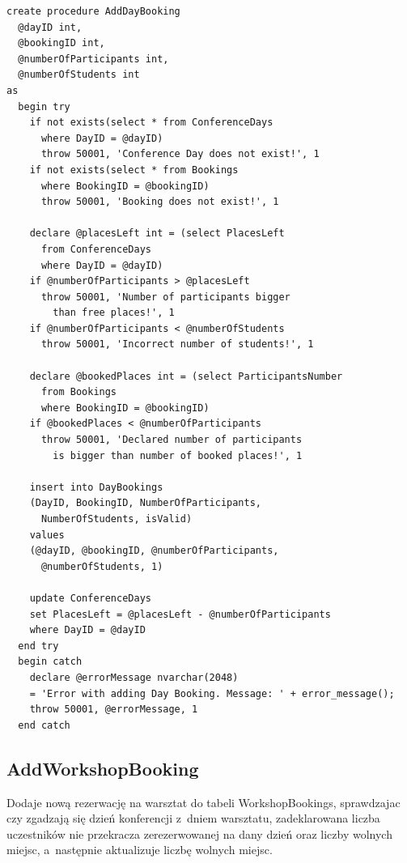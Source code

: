 \documentclass[12pt, a4paper]{mwrep}
\begin{document}
\begin{lstlisting}
create procedure AddDayBooking
  @dayID int,
  @bookingID int,
  @numberOfParticipants int,
  @numberOfStudents int
as
  begin try
    if not exists(select * from ConferenceDays 
      where DayID = @dayID)
      throw 50001, 'Conference Day does not exist!', 1
    if not exists(select * from Bookings 
      where BookingID = @bookingID)
      throw 50001, 'Booking does not exist!', 1

    declare @placesLeft int = (select PlacesLeft 
      from ConferenceDays 
      where DayID = @dayID)
    if @numberOfParticipants > @placesLeft
      throw 50001, 'Number of participants bigger 
        than free places!', 1
    if @numberOfParticipants < @numberOfStudents
      throw 50001, 'Incorrect number of students!', 1
      
    declare @bookedPlaces int = (select ParticipantsNumber 
      from Bookings 
      where BookingID = @bookingID)
    if @bookedPlaces < @numberOfParticipants
      throw 50001, 'Declared number of participants 
        is bigger than number of booked places!', 1

    insert into DayBookings
    (DayID, BookingID, NumberOfParticipants, 
      NumberOfStudents, isValid)
    values
    (@dayID, @bookingID, @numberOfParticipants, 
      @numberOfStudents, 1)

    update ConferenceDays
    set PlacesLeft = @placesLeft - @numberOfParticipants
    where DayID = @dayID
  end try
  begin catch
    declare @errorMessage nvarchar(2048)
    = 'Error with adding Day Booking. Message: ' + error_message();
    throw 50001, @errorMessage, 1
  end catch
\end{lstlisting}

\subsection{AddWorkshopBooking}

\noindent Dodaje nową rezerwację na warsztat do tabeli WorkshopBookings, sprawdzajac czy zgadzają się dzień konferencji z~dniem warsztatu, zadeklarowana liczba uczestników nie przekracza zerezerwowanej na dany dzień oraz liczby wolnych miejsc, a~następnie aktualizuje liczbę wolnych miejsc.
\end{document}
